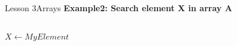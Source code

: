 \documentclass[aspectratio=1610]{beamer}
\begin{document}
\begin{frame}{Lesson 3}{Arrays}
\Large
\textbf{Example2: Search element X in array A}\\~\\
\label{SearchArray}
\begin{algorithmic}[1]
 
\State $X\gets MyElement$
    \State {}  
\EndIf
\EndFor
\State {} 
\EndProcedure
\end{algorithmic}
\end{frame}
\end{document}
